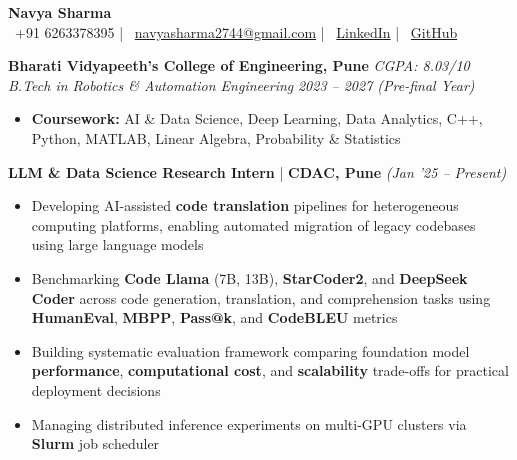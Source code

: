\documentclass[10pt]{article}
\newcommand{\xfill}[2][1ex]{
    \dimen0=#2\advance\dimen0 by #1
    \leaders\hrule height \dimen0 depth -#1\hfill
}
\renewcommand{\section}[1]{
    \vspace{3pt}
    {\color{RoyalBlue}{\normalsize\scshape\raggedright #1\xfill[0pt]{0.5pt}}}
    \vspace{1pt}
}
\newcommand{\filldate}[1]{\hfill {\small \textit{(#1)}}}
\begin{document}
\begin{center}
    {\fontsize{26}{30}\selectfont \textbf{Navya Sharma}} \\[3pt]
    \small
    \faPhone\ +91 6263378395 \enspace|\enspace
    \faEnvelopeO\ \href{mailto:navyasharma2744@gmail.com}{navyasharma2744@gmail.com} \enspace|\enspace
    \faLinkedinSquare\ \href{https://www.linkedin.com/in/navya-sharma-linkdn/}{LinkedIn} \enspace|\enspace
    \faGithub\ \href{https://github.com/NavyaSharma2744}{GitHub}
\end{center}
\vspace{-8pt}

\section{Education}
\vspace{1pt}
\textbf{Bharati Vidyapeeth's College of Engineering, Pune} \hfill \textit{CGPA: 8.03/10} \\
\textit{B.Tech in Robotics \& Automation Engineering} \hfill \textit{2023 -- 2027 (Pre-final Year)}
\begin{itemize}
    \item \textbf{Coursework:} AI \& Data Science, Deep Learning, Data Analytics, C++, Python, MATLAB, Linear Algebra, Probability \& Statistics
\end{itemize}

\section{Research \& Industry Experience}

\vspace{1pt}
\textbf{LLM \& Data Science Research Intern} | \textbf{CDAC, Pune} \filldate{Jan '25 -- Present}
\begin{itemize}
\hrule \vspace{1pt}
    \item Developing AI-assisted \textbf{code translation} pipelines for heterogeneous computing platforms, enabling automated migration of legacy codebases using large language models
    \item Benchmarking \textbf{Code Llama} (7B, 13B), \textbf{StarCoder2}, and \textbf{DeepSeek Coder} across code generation, translation, and comprehension tasks using \textbf{HumanEval}, \textbf{MBPP}, \textbf{Pass@k}, and \textbf{CodeBLEU} metrics
    \item Building systematic evaluation framework comparing foundation model \textbf{performance}, \textbf{computational cost}, and \textbf{scalability} trade-offs for practical deployment decisions
    \item Managing distributed inference experiments on multi-GPU clusters via \textbf{Slurm} job scheduler
\end{itemize}
\end{document}
